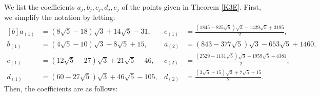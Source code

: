 \documentclass[11pt]{amsart}
\numberwithin{equation}{section}
\numberwithin{table}{section}
\newcommand\<{\langle}
\begin{document}
We list the coefficients $a_j, b_j, c_j, d_j, e_j$ of the points given in Theorem \ref{K3E}.
First, we  simplify the notation by letting:
{\small $$	\begin{aligned}[b]
		a_{(1)}&= (8 \sqrt{5} -18 ) \sqrt{3} +14 \sqrt{5}- 31, &  e_{(1)}&=\frac{(1845-825 \sqrt{5})\sqrt{3} - 1429 \sqrt{5} + 3195}{2}, \\
		b_{(1)}&= (4 \sqrt{5} -10) \sqrt{3} -8 \sqrt{5}+15,  & a_{(2)}&=(843-377 \sqrt{5}) \sqrt{3} - 653 \sqrt{5} +1460,   \\
		c_{(1)}&= (12 \sqrt{5} -27 ) \sqrt{3} +21 \sqrt{5}- 46,  & c_{(2)}&=\frac{(2529-1131 \sqrt{5}) \sqrt{3} - 1959 \sqrt{5}+4381}{2}, \\
		d_{(1)}&= (60-27 \sqrt{5}) \sqrt{3} + 46 \sqrt{5}- 105, & d_{(2)}&=\frac{(3 \sqrt{5} + 15 )\sqrt{3} + 7 \sqrt{5}+ 15}{2}. 
	\end{aligned}$$}
Then,	the coefficients are as follows:
\end{document}
